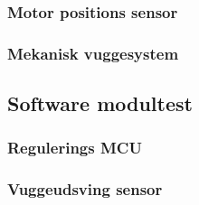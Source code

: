 \subsubsection{Motor positions sensor}

\subsubsection{Mekanisk vuggesystem}


\subsection{Software modultest}
\subsubsection{Regulerings MCU}
\subsubsection{Vuggeudsving sensor}
